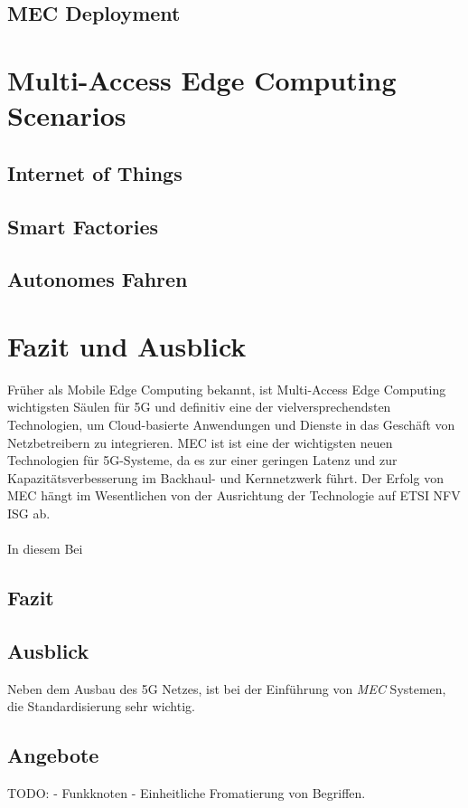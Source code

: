 \documentclass[runningheads]{llncs}
\numberwithin{figure}{section}
\begin{document}
\subsection{MEC Deployment}
\label{subsec:MEC Deployment}
\newpage

\section{Multi-Access Edge Computing Scenarios}

\cite{patelContributorHuaweiVice}
\label{sec:Anwendungen}
\subsection{Internet of Things}
\label{subsec:Internet of Things}
\subsection{Smart Factories}
\label{subsec:Smart Factory}
\subsection{Autonomes Fahren}
\label{subsec:Autonomes Fahren}
\newpage

\section{Fazit und Ausblick}
Früher als Mobile Edge Computing bekannt, ist Multi-Access Edge Computing wichtigsten Säulen für 5G und 
definitiv eine der vielversprechendsten Technologien, 
um Cloud-basierte Anwendungen und Dienste in das Geschäft von Netzbetreibern zu integrieren.
MEC ist ist eine der wichtigsten neuen Technologien für 5G-Systeme, 
da es zur einer geringen Latenz und zur Kapazitätsverbesserung im Backhaul- und Kernnetzwerk führt. 
Der Erfolg von MEC hängt im Wesentlichen von der Ausrichtung der Technologie auf ETSI NFV ISG ab. 
\\
\\
In diesem Bei
\subsection{Fazit}
\subsection{Ausblick}
Neben dem Ausbau des 5G Netzes, ist bei der Einführung von \textit{MEC} Systemen, 
die Standardisierung sehr wichtig. 
\subsection{Angebote}
\label{subsec:Angebote}
\label{sec:Ausblick}


\newpage
%
\printbibliography[heading=bibintoc]
TODO: 
- Funkknoten
- Einheitliche Fromatierung von Begriffen.
\end{document}
